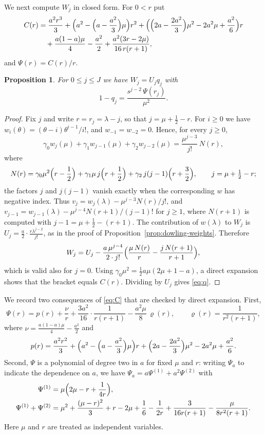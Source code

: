 \documentclass[11pt]{amsart}
\newtheorem{proposition}[theorem]{Proposition}
\theoremstyle{definition}
\theoremstyle{remark}
\numberwithin{equation}{section}
\begin{document}
We next compute $W_j$ in closed form. For $0<r$ put
\begin{align}
C(r)&=\frac{a^2r^3}{3}+\Bigl(a^2-\Bigl(a-\frac{a^2}3\Bigr)\mu\Bigr)r^2+\Bigl(\Bigl(2a-\frac{2a^2}3\Bigr)\mu^2-2a^2\mu+\frac{a^2}6\Bigr)r\notag\\
&\quad+\frac{a(1-a)\mu}4-\frac{a^2}2+\frac{a^2(3r-2\mu)}{16\,r(r+1)},\label{eq:C}
\end{align}
and $\Psi(r)=C(r)/r$.

\begin{proposition}\label{prop:closed}
For $0\le j\le J$ we have $W_j=U_jq_j$ with
\begin{equation}\label{eq:q}
1-q_j=\frac{s^{j-2}\,\Psi(r_j)}{\mu^2}.
\end{equation}
\end{proposition}

\begin{proof}
Fix $j$ and write $r=r_j=\lambda-j$, so that $j=\mu+\frac12-r$. For $i\ge0$ we have $w_i(\theta)=(\theta-i)\theta^{i-1}/i!$, and $w_{-1}=w_{-2}=0$. Hence, for every $j\ge0$,
\[
\gamma_0w_j(\mu)+\gamma_1w_{j-1}(\mu)+\gamma_2w_{j-2}(\mu)=\frac{\mu^{j-3}}{j!}\,N(r),
\]
where
\[
N(r)=\gamma_0\mu^2\Bigl(r-\frac12\Bigr)+\gamma_1\mu\,j\Bigl(r+\frac12\Bigr)+\gamma_2\,j(j-1)\Bigl(r+\frac32\Bigr),\qquad j=\mu+\tfrac12-r;
\]
the factors $j$ and $j(j-1)$ vanish exactly when the corresponding $w$ has negative index. Thus $v_j=w_j(\lambda)-\mu^{j-3}N(r)/j!$, and $v_{j-1}=w_{j-1}(\lambda)-\mu^{j-4}N(r+1)/(j-1)!$ for $j\ge1$, where $N(r+1)$ is computed with $j-1=\mu+\frac12-(r+1)$. The contribution of $w(\lambda)$ to $W_j$ is $U_j=\frac a2\cdot\frac{r\lambda^{j-2}}{j!}$, as in the proof of Proposition~\ref{prop:dowling-weights}. Therefore
\[
W_j=U_j-\frac{a\,\mu^{j-4}}{2\cdot j!}\Bigl(\frac{\mu\,N(r)}{r}-\frac{j\,N(r+1)}{r+1}\Bigr),
\]
which is valid also for $j=0$. Using $\gamma_0\mu^2=\frac12a\mu(2\mu+1-a)$, a direct expansion shows that the bracket equals $C(r)$. Dividing by $U_j$ gives \eqref{eq:q}.
\end{proof}

We record two consequences of \eqref{eq:C} that are checked by direct expansion. First,
\begin{equation}\label{eq:Psi-decomp}
\Psi(r)=p(r)+\frac{\nu}r+\frac{3a^2}{16}\cdot\frac1{r(r+1)}-\frac{a^2\mu}{8}\,\varrho(r),\qquad\varrho(r)=\frac1{r^2(r+1)},
\end{equation}
where $\nu=\frac{a(1-a)\mu}4-\frac{a^2}2$ and
\[
p(r)=\frac{a^2r^2}3+\Bigl(a^2-\Bigl(a-\frac{a^2}3\Bigr)\mu\Bigr)r+\Bigl(2a-\frac{2a^2}3\Bigr)\mu^2-2a^2\mu+\frac{a^2}6.
\]
Second, $\Psi$ is a polynomial of degree two in $a$ for fixed $\mu$ and $r$: writing $\Psi_a$ to indicate the dependence on $a$, we have $\Psi_a=a\Psi^{(1)}+a^2\Psi^{(2)}$ with
\begin{equation}\label{eq:Psi12}
\begin{aligned}
\Psi^{(1)}&=\mu\Bigl(2\mu-r+\frac1{4r}\Bigr),\\
\Psi^{(1)}+\Psi^{(2)}&=\mu^2+\frac{(\mu-r)^2}3+r-2\mu+\frac16-\frac1{2r}+\frac{3}{16r(r+1)}-\frac{\mu}{8r^2(r+1)}.
\end{aligned}
\end{equation}
Here $\mu$ and $r$ are treated as independent variables.
\end{document}
